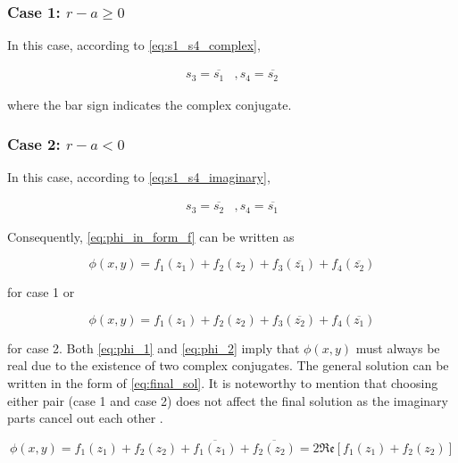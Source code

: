 \documentclass{article}
\begin{document}
\subsubsection*{Case 1: \texorpdfstring{$r - a \geq 0$}{}}
In this case, according to \cref{eq:s1_s4_complex}, 

\begin{equation*}
    \begin{matrix}
    s_3 = \overline{s_1} & , 
    s_4 = \overline{s_2}
    \end{matrix}
\end{equation*}

where the bar sign indicates the complex conjugate.

\subsubsection*{Case 2: \texorpdfstring{$r - a < 0$}{}}
In this case, according to \cref{eq:s1_s4_imaginary}, 

\begin{equation*}
    \begin{matrix}
    s_3 = \overline{s_2} & , 
    s_4 = \overline{s_1}
    \end{matrix}
\end{equation*}

Consequently, \cref{eq:phi_in_form_f} can be written as 

\begin{equation}
    \phi(x, y) = f_1(z_1) + f_2(z_2) + f_3(\overline{z_1}) + f_4(\overline{z_2})
    \label{eq:phi_1}
\end{equation}

for case 1 or 

\begin{equation}
    \phi(x, y) = f_1(z_1) + f_2(z_2) + f_3(\overline{z_2}) + f_4(\overline{z_1})
    \label{eq:phi_2}
\end{equation}

for case 2. Both \cref{eq:phi_1} and \cref{eq:phi_2} imply that $\phi(x,y)$ must always be real due to the existence of two complex conjugates. The general solution can be written in the form of \cref{eq:final_sol}. It is noteworthy to mention that choosing either pair (case 1 and case 2) does not affect the final solution as the imaginary parts cancel out each other \cite{Koussios2015}.

\begin{equation}
    \phi(x, y) = f_1(z_1) + f_2(z_2) + \overline{f_1(z_1)} + \overline{f_2(z_2)} = 2 \mathfrak{Re}[f_1(z_1) + f_2(z_2)]
    \label{eq:final_sol}
\end{equation}
\end{document}
